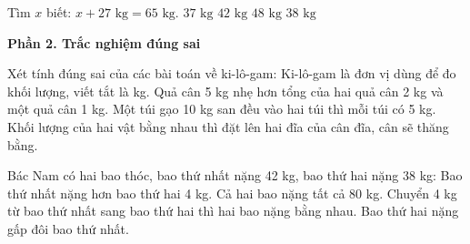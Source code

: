 \begin{ex} %
Tìm $x$ biết: $x + 27\text{ kg} = 65\text{ kg}$.
\choice
{$37\text{ kg}$}
{$42\text{ kg}$}
{$48\text{ kg}$}
{\True $38\text{ kg}$}
\end{ex}

\textbf{Phần 2. Trắc nghiệm đúng sai}

\begin{ex} %
Xét tính đúng sai của các bài toán về ki-lô-gam:
\choiceTF
{\True Ki-lô-gam là đơn vị dùng để đo khối lượng, viết tắt là kg.}
{Quả cân 5 kg nhẹ hơn tổng của hai quả cân 2 kg và một quả cân 1 kg.}
{\True Một túi gạo 10 kg san đều vào hai túi thì mỗi túi có 5 kg.}
{\True Khối lượng của hai vật bằng nhau thì đặt lên hai đĩa của cân đĩa, cân sẽ thăng bằng.}
\end{ex}

\begin{ex} %
Bác Nam có hai bao thóc, bao thứ nhất nặng 42 kg, bao thứ hai nặng 38 kg:
\choiceTF
{\True Bao thứ nhất nặng hơn bao thứ hai 4 kg.}
{\True Cả hai bao nặng tất cả 80 kg.}
{Chuyển 4 kg từ bao thứ nhất sang bao thứ hai thì hai bao nặng bằng nhau.}
{Bao thứ hai nặng gấp đôi bao thứ nhất.}
\end{ex}

